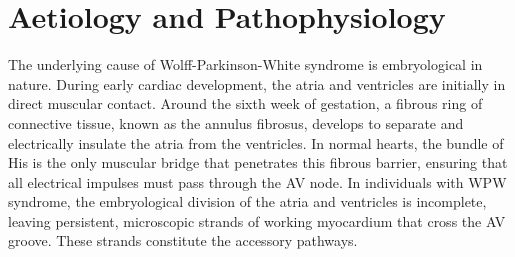 \section*{Aetiology and Pathophysiology}
The underlying cause of Wolff-Parkinson-White syndrome is embryological in nature. During early cardiac development, the atria and ventricles are initially in direct muscular contact. Around the sixth week of gestation, a fibrous ring of connective tissue, known as the annulus fibrosus, develops to separate and electrically insulate the atria from the ventricles. In normal hearts, the bundle of His is the only muscular bridge that penetrates this fibrous barrier, ensuring that all electrical impulses must pass through the AV node. In individuals with WPW syndrome, the embryological division of the atria and ventricles is incomplete, leaving persistent, microscopic strands of working myocardium that cross the AV groove. These strands constitute the accessory pathways.

